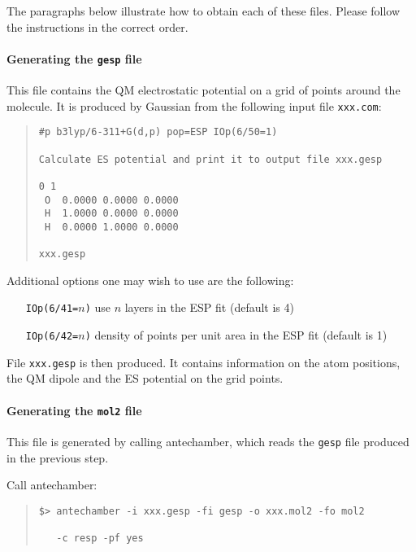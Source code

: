 \documentclass[a4paper]{report}
\begin{document}
The paragraphs below illustrate how to obtain each of these files. Please follow the instructions in
the correct order.

\paragraph*{Generating the \texttt{gesp} file}

This file contains the QM electrostatic potential on a grid of points around the
molecule. It is produced by Gaussian from the following input file \texttt{xxx.com}:

\begin{framed}
\begin{quote}
\begin{verbatim}
#p b3lyp/6-311+G(d,p) pop=ESP IOp(6/50=1)

Calculate ES potential and print it to output file xxx.gesp

0 1
 O  0.0000 0.0000 0.0000
 H  1.0000 0.0000 0.0000
 H  0.0000 1.0000 0.0000

xxx.gesp
\end{verbatim}
\end{quote}
\end{framed}

Additional options one may wish to use are the following:
\begin{itemize}
\item[\texttt{IOp(6/41=$n$)}] use $n$ layers in the ESP fit (default is 4)
\item[\texttt{IOp(6/42=$n$)}] density of points per unit area in the ESP fit (default
is 1)
\end{itemize}

File \texttt{xxx.gesp} is then produced. It contains information on the atom
positions, the QM dipole and the ES potential on the grid points.

\paragraph*{Generating the \texttt{mol2} file}

This file is generated by calling antechamber, which reads the \texttt{gesp} file
produced in the previous step.

Call antechamber:

\begin{framed}
\begin{quote}
\begin{verbatim}
$> antechamber -i xxx.gesp -fi gesp -o xxx.mol2 -fo mol2 

   -c resp -pf yes
\end{verbatim}
\end{quote}
\end{framed}
\end{document}
